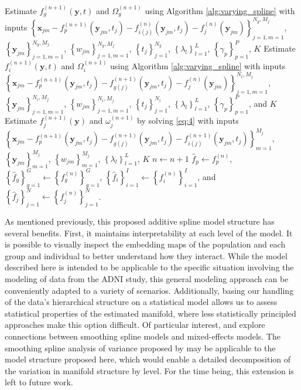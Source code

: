 \documentclass[11pt,reqno]{article}
\theoremstyle{definition}
\begin{document}
\begin{algorithm}
{{      Estimate $f_{g}^{(n+1)}(\mathbf{y}, t)$ and $\Omega_{g}^{(n+1)}$ using Algorithm \ref{alg:varying_spline} with inputs $\left\{\mathbf{x}_{jm} - f_{p}^{(n+1)}(\mathbf{y}_{jm}, t_j) - f_{i(j)}^{(n)}(\mathbf{y}_{jm}, t_j) - f_{j}^{(n)}(\mathbf{y}_{jm})\right\}_{j=1, m=1}^{N_g, M_j}$, $\left\{\mathbf{y}_{jm}\right\}_{j=1, m=1}^{N_g, M_j}$, $\left\{w_{jm}\right\}_{j=1, m=1}^{N_g, M_j}$, $\left\{t_j\right\}_{j=1}^{N_g}$, $\left\{\lambda_l\right\}_{l=1}^{L}$, $\left\{\gamma_p\right\}_{p=1}^{P}$, $K$\;
    }
     {
      Estimate $f_{i}^{(n+1)}(\mathbf{y}, t)$ and $\Omega_{i}^{(n+1)}$ using Algorithm \ref{alg:varying_spline} with inputs $\left\{\mathbf{x}_{jm} - f_{p}^{(n+1)}(\mathbf{y}_{jm}, t_j) - f_{g(j)}^{(n+1)}(\mathbf{y}_{jm}, t_j) - f_j^{(n)}(\mathbf{y}_{jm})\right\}_{j=1, m=1}^{N_i, M_j}$, $\left\{\mathbf{y}_{jm}\right\}_{j=1, m=1}^{N_i, M_j}$, $\left\{w_{jm}\right\}_{j=1, m=1}^{N_i, M_j}$, $\left\{t_j\right\}_{j=1}^{N_i}$, $\left\{\lambda_l\right\}_{l=1}^{L}$, $\left\{\gamma_p\right\}_{p=1}^{P}$, and $K$\;
    }
     {
      Estimate $f_{j}^{(n+1)}(\mathbf{y})$ and $\omega_{j}^{(n+1)}$ by solving \ref{eq:4} with inputs $\left\{\mathbf{x}_{jm} - f_{p}^{(n+1)}(\mathbf{y}_{jm}, t_j) - f_{g(j)}^{(n+1)}(\mathbf{y}_{jm}, t_j) - f_{i(j)}^{(n+1)}(\mathbf{y}_{jm}, t_j)\right\}_{m=1}^{M_j}$, $\left\{\mathbf{y}_{jm}\right\}_{m=1}^{M_j}$, $\left\{w_{jm}\right\}_{m = 1}^{M_j}$, $\left\{\lambda_l\right\}_{l=1}^{L}$, $K$\;
    }
    $n \gets n + 1$\;
  }
  $\hat{f}_p \gets f_{p}^{(n)}$, $\left\{\hat{f}_g\right\}_{g = 1}^{G} \gets \left\{f_{g}^{(n)}\right\}_{g = 1}^{G}$, $\left\{\hat{f}_i\right\}_{i=1}^{I} \gets \left\{f_{i}^{(n)}\right\}_{i=1}^{I}$, and $\left\{\hat{f}_j\right\}_{j=1}^{N} \gets \left\{f_j^{(n)}\right\}_{j=1}^{N}$.
\end{algorithm}

As mentioned previously, this proposed additive spline model structure has several benefits. First, it maintains interpretability at each level of the model. It is possible to visually inspect the embedding maps of the population and each group and individual to better understand how they interact. While the model described here is intended to be applicable to the specific situation involving the modeling of data from the ADNI study, this general modeling approach can be conveniently adapted to a variety of scenarios. Additionally, basing our handling of the data's hierarchical structure on a statistical model allows us to assess statistical properties of the estimated manifold, where less statistically principled approaches make this option difficult. Of particular interest, \cite{wangMixedEffectsSmoothing1998} and \cite{brumbackSmoothingSplineModels1998} explore connections between smoothing spline models and mixed-effects models. The smoothing spline analysis of variance proposed by \cite{wangMixedEffectsSmoothing1998} may be applicable to the model structure proposed here, which would enable a detailed decomposition of the variation in manifold structure by level. For the time being, this extension is left to future work.
\end{document}
